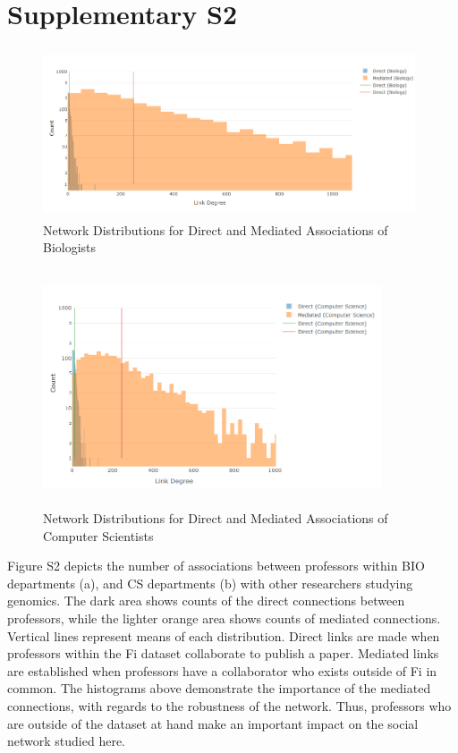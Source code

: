 \documentclass[10pt]{article}         %
\begin{document}
\section{Supplementary S2}
\begin{figure}[!htb]
  \centering
  \includegraphics[width=11cm, height=5cm]{Fig2SA.PNG}
  \caption{Network Distributions for Direct and Mediated Associations of Biologists}
  \label{fig:S2A}
\end{figure}
\begin{figure}[!htb]
  \centering
  \includegraphics[width=10cm, height=7cm]{Fig2SB.PNG}
  \caption{Network Distributions for Direct and Mediated Associations of Computer Scientists}
  \label{fig:S2B}
\end{figure}
Figure S2 depicts the number of associations between professors within BIO departments (a), and CS departments (b) with other researchers studying genomics. The dark area shows counts of the direct connections between professors, while the lighter orange area shows counts of mediated connections. Vertical lines represent means of each distribution. Direct links are made when professors within the Fi dataset collaborate to publish a paper. Mediated links are established when professors have a collaborator who exists outside of Fi in common. The histograms above demonstrate the importance of the mediated connections, with regards to the robustness of the network. Thus, professors who are outside of the dataset at hand make an important impact on the social network studied here.  
\end{document}
